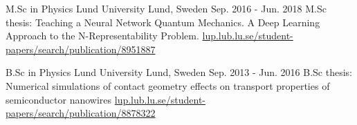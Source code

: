 


\begin{cventries}


\cventry
{M.Sc in Physics} %
{Lund University} %
{Lund, Sweden} %
{Sep. 2016 - Jun. 2018} %
{ %
  M.Sc thesis: Teaching a Neural Network Quantum Mechanics. A Deep Learning Approach to the
N-Representability Problem.
\href{https://lup.lub.lu.se/student-papers/search/publication/8951887}{lup.lub.lu.se/student-papers/search/publication/8951887}
}

\cventry
{B.Sc in Physics} %
{Lund University} %
{Lund, Sweden} %
{Sep. 2013 - Jun. 2016} %
{ %
  B.Sc thesis: Numerical simulations of contact geometry effects on transport properties of semiconductor nanowires
  \href{https://lup.lub.lu.se/student-papers/search/publication/8878322}{lup.lub.lu.se/student-papers/search/publication/8878322}
}


\end{cventries}
